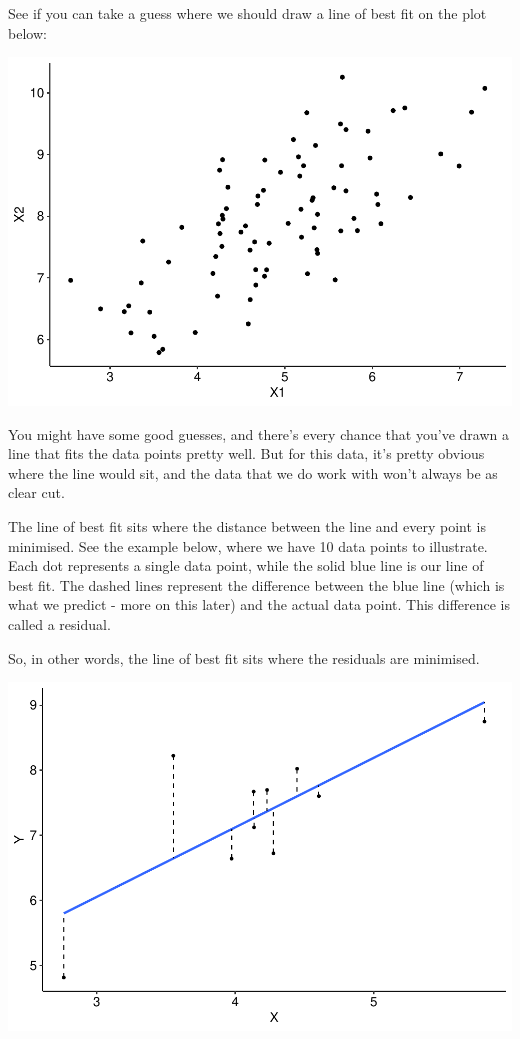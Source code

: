 \documentclass[
]{book}
\begin{document}
See if you can take a guess where we should draw a line of best fit on the plot below:

\begin{center}\includegraphics{_main_files/figure-latex/unnamed-chunk-203-1} \end{center}

You might have some good guesses, and there's every chance that you've drawn a line that fits the data points pretty well. But for this data, it's pretty obvious where the line would sit, and the data that we do work with won't always be as clear cut.

The line of best fit sits where the distance between the line and every point is minimised. See the example below, where we have 10 data points to illustrate. Each dot represents a single data point, while the solid blue line is our line of best fit. The dashed lines represent the difference between the blue line (which is what we predict - more on this later) and the actual data point. This difference is called a residual.

So, in other words, the line of best fit sits where the residuals are minimised.

\begin{center}\includegraphics{_main_files/figure-latex/unnamed-chunk-204-1} \end{center}
\end{document}
